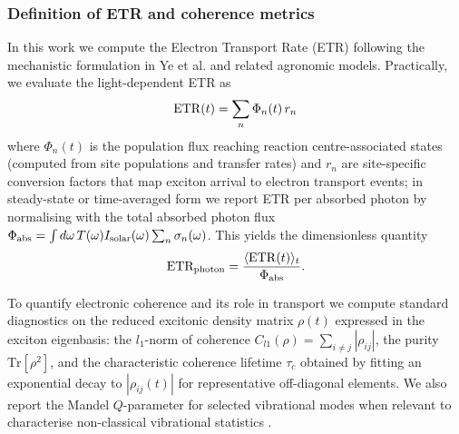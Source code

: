 \documentclass[aps,prb,onecolumn,superscriptaddress,notitlepage,nofootinbib,longbibliography,10pt]{revtex4-2}
\begin{document}
\subsubsection*{Definition of ETR and coherence metrics}
In this work we compute the Electron Transport Rate (ETR) following the mechanistic formulation in Ye et al. and related agronomic models. Practically, we evaluate the light-dependent ETR as
\begin{equation}
{\rm ETR}(t) = \sum_n \Phi_n(t)\,r_n
\end{equation}
where $\Phi_n(t)$ is the population flux reaching reaction centre-associated states (computed from site populations and transfer rates) and $r_n$ are site-specific conversion factors that map exciton arrival to electron transport events; in steady-state or time-averaged form we report ETR per absorbed photon by normalising with the total absorbed photon flux $\Phi_{\rm abs}=\int d\omega\,T(\omega)I_{\rm solar}(\omega)\sum_n\sigma_n(\omega)$. This yields the dimensionless quantity
\begin{equation}
{\rm ETR_{photon}} = \frac{\langle {\rm ETR}(t) \rangle_t}{\Phi_{\rm abs}}.
\end{equation}

To quantify electronic coherence and its role in transport we compute standard diagnostics on the reduced excitonic density matrix $\mathtt{\rho}(t)$ expressed in the exciton eigenbasis: the $l_1$-norm of coherence $C_{l1}(\mathtt{\rho})=\sum_{i\neq j}|\mathtt{\rho}_{ij}|$, the purity $\mathrm{Tr}[\mathtt{\rho}^2]$, and the characteristic coherence lifetime $\tau_c$ obtained by fitting an exponential decay to $|\mathtt{\rho}_{ij}(t)|$ for representative off-diagonal elements. We also report the Mandel $Q$-parameter for selected vibrational modes when relevant to characterise non-classical vibrational statistics \cite{oreilly2014}.
\end{document}
